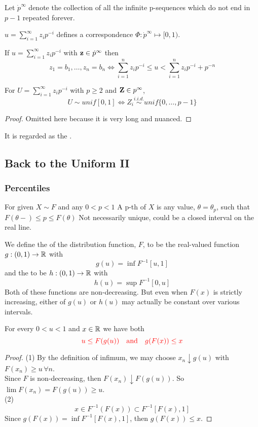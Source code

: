 \documentclass[11pt]{article}
\numberwithin{equation}{section}
\begin{document}
\notation
Let $\dot{p}^\infty$ denote the collection of all the infinite p-sequences which do not end in $p-1$ repeated forever.

$u = \sum_{i=1}^\infty z_i p^{-i}$ defines a correspondence $\Phi: \dot{p}^\infty \mapsto [0, 1)$.

If $u = \sum_{i=1}^\infty z_i p^{-i}$ with $\textbf{z} \in \dot{p}^\infty$ then
$$z_1 = b_1, \hdots, z_n = b_n \iff \sum_{i=1}^n z_i p^{-i} \leq u < \sum_{i=1}^n z_i p^{-i} + p^{-n}$$

For $U = \sum_{i=1}^\infty z_i p^{-i}$ with $p \geq 2$ and $\textbf{Z} \in p^\infty$,
$$U \sim unif[0,1] \iff Z_i \overset{i.i.d.}{\sim} unif\{0, \hdots, p-1\}$$
\begin{proof}
	Omitted here because it is very long and nuanced.
\end{proof}
\remark 
It is regarded as the .

\subsection{Back to the Uniform II}
\subsubsection{Percentiles}
For  given $X \sim F$ and any $0 < p < 1$
 A p-th  of $X$ is any value, $\theta = \theta_p$, such that $F(\theta-) \leq p \leq F(\theta)$
\remark
Not necessarily unique, could be a closed interval on the real line.

 We define the  of the distribution function, $F$, to be the real-valued function $g:(0, 1) \rightarrow \mathbb{R}$ with
\begin{equation}
	g(u) = \inf F^{-1}[u, 1]
\end{equation}
and the  to be
$h:(0,1) \rightarrow \mathbb{R}$ with
\begin{equation}
	h(u) = \sup F^{-1}[0,u]
\end{equation}
\remark
Both of these functions are non-decreasing. But even when $F(x)$ is strictly increasing, either of $g(u)$ or $h(u)$ may actually be constant over various intervals.

\proposition For every $0<u<1$ and $x \in \mathbb{R}$ we have both
\begin{equation}
	\textcolor{red}{u \leq F(g(u)) \quad \text{and} \quad g(F(x)) \leq x}
\end{equation}
\begin{proof}
	(1) By the definition of infimum, we may choose $x_n \downarrow g(u)$ with $F(x_n) \geq u \, \forall n$. \\
	Since $F$ is non-decreasing, then $F(x_n) \downarrow F(g(u))$. So $\lim F(x_n) = F(g(u)) \geq u$. \\
	(2) $$x \in F^{-1}(F(x)) \subset F^{-1}[F(x), 1]$$
	Since $g(F(x)) = \inf F^{-1}[F(x), 1]$, then $g(F(x)) \leq x$.
\end{proof}
\end{document}
